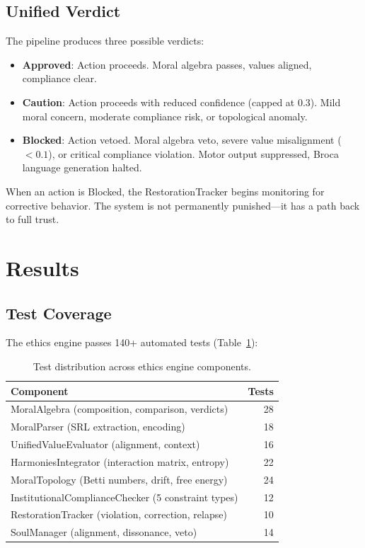 \documentclass[11pt,a4paper]{article}
\begin{document}
\subsection{Unified Verdict}

The pipeline produces three possible verdicts:

\begin{itemize}
  \item \textbf{Approved}: Action proceeds. Moral algebra passes, values aligned, compliance clear.
  \item \textbf{Caution}: Action proceeds with reduced confidence (capped at 0.3). Mild moral concern, moderate compliance risk, or topological anomaly.
  \item \textbf{Blocked}: Action vetoed. Moral algebra veto, severe value misalignment ($< 0.1$), or critical compliance violation. Motor output suppressed, Broca language generation halted.
\end{itemize}

When an action is Blocked, the RestorationTracker begins monitoring for corrective behavior. The system is not permanently punished---it has a path back to full trust.

\section{Results}

\subsection{Test Coverage}

The ethics engine passes 140+ automated tests (Table~\ref{tab:ethics_tests}):

\begin{table}[h]
\centering
\caption{Test distribution across ethics engine components.}
\label{tab:ethics_tests}
\begin{tabular}{lr}
\toprule
\textbf{Component} & \textbf{Tests} \\
\midrule
MoralAlgebra (composition, comparison, verdicts) & 28 \\
MoralParser (SRL extraction, encoding) & 18 \\
UnifiedValueEvaluator (alignment, context) & 16 \\
HarmoniesIntegrator (interaction matrix, entropy) & 22 \\
MoralTopology (Betti numbers, drift, free energy) & 24 \\
InstitutionalComplianceChecker (5 constraint types) & 12 \\
RestorationTracker (violation, correction, relapse) & 10 \\
SoulManager (alignment, dissonance, veto) & 14 \\
\bottomrule
\end{tabular}
\end{table}
\end{document}
